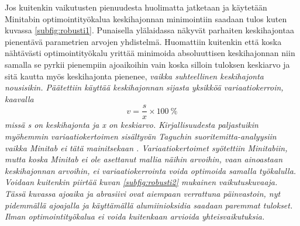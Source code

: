 \documentclass[12pt,a4paper,finnish]{tutthesis}
\begin{document}
Jos kuitenkin vaikutusten pienuudesta huolimatta
jatketaan ja käytetään Minitabin optimointityökalua keskihajonnan minimointiin
saadaan tulos kuten kuvassa \ref{subfig:robusti1}.
Punaisella ylälaidassa näkyvät parhaiten keskihajontaa pienentävä parametrien arvojen yhdistelmä. Huomattiin kuitenkin että koska nähtävästi
optimointityökalu yrittää minimoida absoluuttisen keskihajonnan niin samalla se
pyrkii pienempiin ajoaikoihin vain koska silloin tuloksen keskiarvo ja sitä kautta myös keskihajonta pienenee, \em vaikka suhteellinen keskihajonta nousisikin. \em Päätettiin käyttää keskihajonnan sijasta yksikköä \em variaatiokerroin, \em kaavalla
\[v = \frac{s}{x} \times 100\> \%\]
missä \em s \em on keskihajonta ja \em x \em on keskiarvo.
Kirjallisuudesta paljastuikin myöhemmin variaatiokertoimen sisältyvän Taguchin suoritemitta-analyysiin vaikka Minitab ei tätä mainitsekaan \parencite{Steinberg1998,Kawamura2010,Wu2009}.
Variaatiokertoimet syötettiin Minitabiin, mutta koska Minitab ei ole asettanut mallia näihin arvoihin, vaan ainoastaan keskihajonnan arvoihin, ei variaatiokerrointa voida optimoida samalla työkalulla. Voidaan kuitenkin piirtää kuvan \ref{subfig:robusti2} mukainen vaikutuskuvaaja.
Tässä kuvassa ajoaika ja abrasiivi ovat aiempaan verrattuna päinvastoin, nyt pidemmällä ajoajalla ja käyttämällä alumiinioksidia saadaan paremmat tulokset. Ilman optimointityökalua ei voida kuitenkaan arvioida yhteisvaikutuksia.
\end{document}
